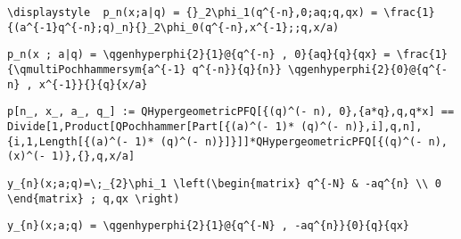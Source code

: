 \newsavebox\DIT
\begin{lrbox}{\DIT}
 \begin{minipage}[t]{0.82\textwidth}
  \lstinline[language={[latex]TeX},mathescape,breaklines=true]"\displaystyle  p_n(x;a|q) = {}_2\phi_1(q^{-n},0;aq;q,qx) = \frac{1}{(a^{-1}q^{-n};q)_n}{}_2\phi_0(q^{-n},x^{-1};;q,x/a)"
 \end{minipage}
\end{lrbox}
\newsavebox\DIST
\begin{lrbox}{\DIST}
 \begin{minipage}[t]{0.82\textwidth}
  \lstinline[language={[latex]TeX},mathescape,breaklines=true]"p_n(x ; a|q) = \qgenhyperphi{2}{1}@{q^{-n} , 0}{aq}{q}{qx} = \frac{1}{\qmultiPochhammersym{a^{-1} q^{-n}}{q}{n}} \qgenhyperphi{2}{0}@{q^{-n} , x^{-1}}{}{q}{x/a}"
 \end{minipage}
\end{lrbox}
\newsavebox\DIMM
\begin{lrbox}{\DIMM}
 \begin{minipage}[t]{0.82\textwidth}
  \lstinline[language={[latex]TeX},mathescape,breaklines=true]"p[n_, x_, a_, q_] := QHypergeometricPFQ[{(q)^(- n), 0},{a*q},q,q*x] == Divide[1,Product[QPochhammer[Part[{(a)^(- 1)* (q)^(- n)},i],q,n],{i,1,Length[{(a)^(- 1)* (q)^(- n)}]}]]*QHypergeometricPFQ[{(q)^(- n), (x)^(- 1)},{},q,x/a]"
 \end{minipage}
\end{lrbox}
\newsavebox\DIMA
\begin{lrbox}{\DIMA}
 \begin{minipage}[t]{0.82\textwidth}
  \lstinline[language={[latex]TeX},mathescape,breaklines=true]""
 \end{minipage}
\end{lrbox}
\newsavebox\DJT
\begin{lrbox}{\DJT}
 \begin{minipage}[t]{0.82\textwidth}
  \lstinline[language={[latex]TeX},mathescape,breaklines=true]"y_{n}(x;a;q)=\;_{2}\phi_1 \left(\begin{matrix} q^{-N} & -aq^{n} \\ 0  \end{matrix} ; q,qx \right)"
 \end{minipage}
\end{lrbox}
\newsavebox\DJST
\begin{lrbox}{\DJST}
 \begin{minipage}[t]{0.82\textwidth}
  \lstinline[language={[latex]TeX},mathescape,breaklines=true]"y_{n}(x;a;q) = \qgenhyperphi{2}{1}@{q^{-N} , -aq^{n}}{0}{q}{qx}"
 \end{minipage}
\end{lrbox}
